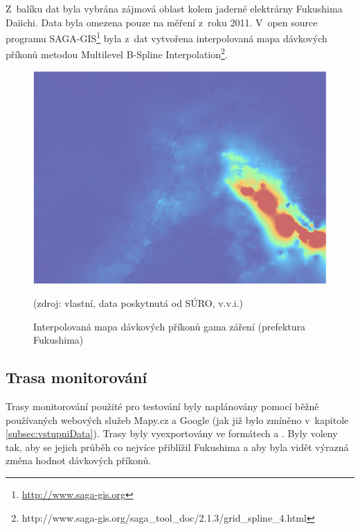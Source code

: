 Z~balíku dat byla vybrána zájmová oblast kolem jaderné elektrárny
Fukushima Daiichi. Data byla omezena pouze na měření z~roku
2011. V~open source programu
SAGA-GIS\footnote{\url{http://www.saga-gis.org}} byla z~dat
vytvořena interpolovaná mapa dávkových příkonů metodou Multilevel
B-Spline
Interpolation\footnote{http://www.saga-gis.org/saga\_tool\_doc/2.1.3/grid\_spline\_4.html}.

\begin{figure}[H] \centering
    \includegraphics[scale=0.4]{./pictures/interpolovana_mapa.png}
      	\caption[Interpolovaná mapa dávkových příkonů (prefektura
Fukushima)]{Interpolovaná mapa dávkových příkonů gama záření
(prefektura Fukushima)}(zdroj: vlastní, data poskytnutá od SÚRO,
v.v.i.)
    	\label{fig:interpolatedMap}
\end{figure}

\subsection{Trasa monitorování} Trasy monitorování použité pro
testování byly naplánovány pomocí běžně používaných webových služeb
Mapy.cz a Google (jak již bylo zmíněno v~kapitole
\ref{subsec:vstupniData}). Trasy byly vyexportovány ve formátech
 a . Byly voleny tak, aby se jejich průběh co nejvíce
přiblížil  Fukushima a aby byla vidět výrazná změna hodnot
dávkových příkonů.

